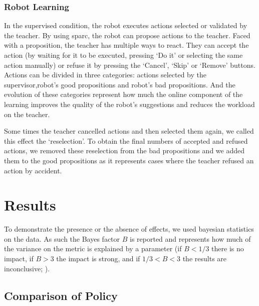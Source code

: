 
\subsubsection{Robot Learning}

In the supervised condition, the robot executes actions selected or validated by the teacher. By using \gls{sparc}, the robot can propose actions to the teacher. Faced with a proposition, the teacher has multiple ways to react. They can accept the action (by waiting for it to be executed, pressing `Do it' or selecting the same action manually) or refuse it by pressing the `Cancel', `Skip' or `Remove' buttons. Actions can be divided in three categories: actions selected by the supervisor,robot's good propositions and robot's bad propositions. And the evolution of these categories represent how much the online component of the learning improves the quality of the robot's suggestions and reduces the workload on the teacher. 

Some times the teacher cancelled actions and then selected them again, we called this effect the `reselection'. To obtain the final numbers of accepted and refused actions, we removed these reselection from the bad propositions and we added them to the good propositions as it represents cases where the teacher refused an action by accident.

\section{Results}

To demonstrate the presence or the absence of effects, we used bayesian statistics on the data. As such the Bayes factor $B$ is reported and represents how much of the variance on the metric is explained by a parameter (if $B < 1/3$ there is no impact, if $B > 3$ the impact is strong, and if $1/3<B<3$ the results are inconclusive; \cite{jeffreys1998theory,dienes2011bayesian}). 


\subsection{Comparison of Policy}

